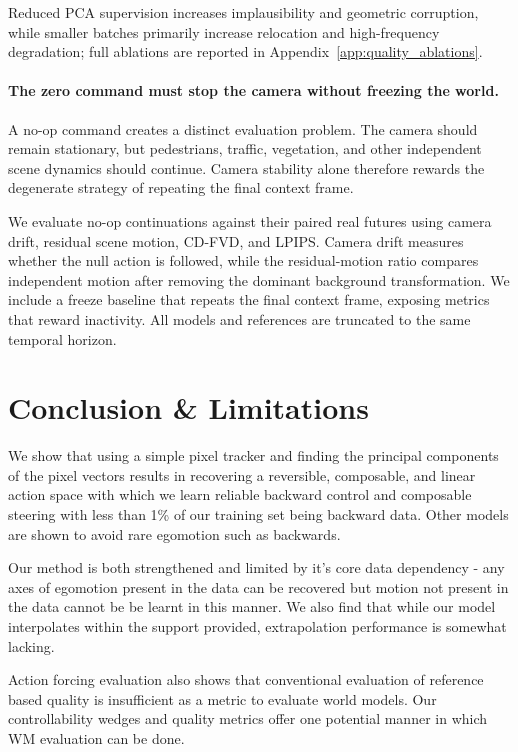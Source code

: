 \documentclass[letterpaper]{article} %
\begin{document}
Reduced PCA supervision increases implausibility and geometric corruption,
while smaller batches primarily increase relocation and high-frequency
degradation; full ablations are reported in
Appendix~\ref{app:quality_ablations}.

\paragraph{The zero command must stop the camera without freezing the world.}
A no-op command creates a distinct evaluation problem. The camera should
remain stationary, but pedestrians, traffic, vegetation, and other independent
scene dynamics should continue. Camera stability alone therefore rewards the
degenerate strategy of repeating the final context frame.

We evaluate no-op continuations against their paired real futures using
camera drift, residual scene motion, CD-FVD, and LPIPS. Camera drift measures
whether the null action is followed, while the residual-motion ratio compares
independent motion after removing the dominant background transformation.
We include a freeze baseline that repeats the final context frame, exposing
metrics that reward inactivity. All models and references are truncated to
the same temporal horizon.


\section{Conclusion \& Limitations}

We show that using a simple pixel tracker and finding the principal components of the pixel vectors results in recovering a reversible, composable, and linear action space with which we learn reliable backward control and composable steering with less than 1\% of our training set being backward data. Other models are shown to avoid rare egomotion such as backwards.

Our method is both strengthened and limited by it's core data dependency - any axes of egomotion present in the data can be recovered but motion not present in the data cannot be be learnt in this manner. We also find that while our model interpolates within the support provided, extrapolation performance is somewhat lacking.

Action forcing evaluation also shows that conventional evaluation of reference based quality is insufficient as a metric to evaluate world models. Our controllability wedges and quality metrics offer one potential manner in which WM evaluation can be done.
\end{document}

